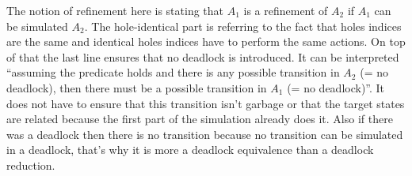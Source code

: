 \documentclass{article}
\begin{document}
The notion of refinement here is stating that \(A_1\) is a refinement of \(A_2\) if \(A_1\) can be simulated  \(A_2\).
The hole-identical part is referring to the fact that holes indices are the same and identical holes indices have to perform the same actions.
On top of that the last line ensures that no deadlock is introduced.
It can be interpreted ``assuming the predicate holds and there is any possible transition in \(A_2\) (= no deadlock), then there must be a possible transition in \(A_1\) (= no deadlock)''.
It does not have to ensure that this transition isn't garbage or that the target states are related because the first part of the simulation already does it.
Also if there was a deadlock then there is no transition because no transition can be simulated in a deadlock, that's why it is more a deadlock equivalence than a deadlock reduction.

\begin{exi} %
\end{exi}
\end{document}
